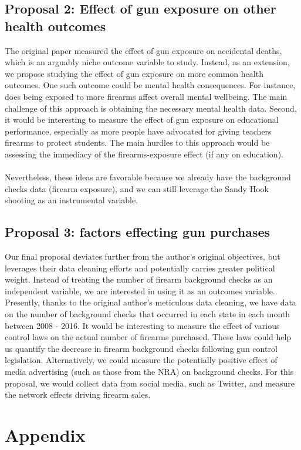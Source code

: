 \documentclass[12pt]{article}%
\begin{document}
\subsection*{Proposal 2: Effect of gun exposure on other health outcomes}
The original paper measured the effect of gun exposure on accidental deaths, which is an arguably niche outcome variable to study. Instead, as an extension, we propose studying the effect of gun exposure on more common health outcomes. One such outcome could be mental health consequences. For instance, does being exposed to more firearms affect overall mental wellbeing. The main challenge of this approach is obtaining the necessary mental health data. Second, it would be interesting to measure the effect of gun exposure on educational performance, especially as more people have advocated for giving teachers firearms to protect students. The main hurdles to this approach would be assessing the immediacy of the firearms-exposure effect (if any on education). \\ \\ 
Nevertheless, these ideas are favorable because we already have the background checks data (firearm exposure), and we can still leverage the Sandy Hook shooting as an instrumental variable. 
\subsection*{Proposal 3: factors effecting gun purchases}
Our final proposal deviates further from the author's original objectives, but leverages their data cleaning efforts and potentially carries greater political weight. Instead of treating the number of firearm background checks as an independent variable, we are interested in using it as an outcomes variable. Presently, thanks to the original author's meticulous data cleaning, we have data on the number of background checks that occurred in each state in each month between 2008 - 2016. It would be interesting to measure the effect of various control laws on the actual number of firearms purchased. These laws could help us quantify the decrease in firearm background checks following gun control legislation. Alternatively, we could measure the potentially positive effect of media advertising (such as those from the NRA) on background checks. For this proposal, we would collect data from social media, such as Twitter, and measure the network effects driving firearm sales.  


\section*{Appendix}
\end{document}
